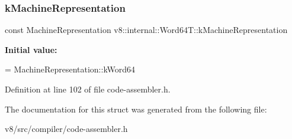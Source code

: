 \subsubsection{\texorpdfstring{k\+Machine\+Representation}{kMachineRepresentation}}
{\footnotesize\ttfamily const Machine\+Representation v8\+::internal\+::\+Word64\+T\+::k\+Machine\+Representation\hspace{0.3cm}{\ttfamily [static]}}

{\bfseries Initial value\+:}
\begin{DoxyCode}
=
      MachineRepresentation::kWord64
\end{DoxyCode}


Definition at line 102 of file code-\/assembler.\+h.



The documentation for this struct was generated from the following file\+:\begin{DoxyCompactItemize}
\item 
v8/src/compiler/code-\/assembler.\+h\end{DoxyCompactItemize}
